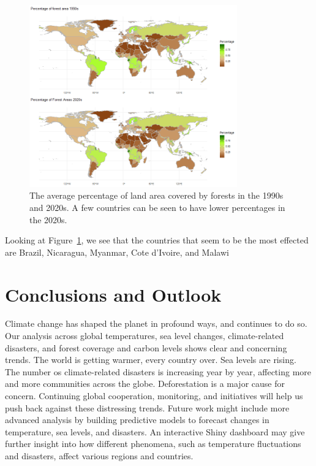 \documentclass[10pt]{article}
\begin{document}
\begin{figure}[H]
    \centering
    \includegraphics[width=0.8\textwidth]{forest_pct.png}
    \caption{The average percentage of land area covered by forests in the 1990s and 2020s. A few countries can be seen to have lower percentages in the 2020s.}
    \label{fig:forest_pct}
\end{figure}

Looking at Figure~\ref{fig:forest_pct}, we see that the countries that seem to be the most effected are Brazil, Nicaragua, Myanmar, Cote d'Ivoire, and Malawi


\section{Conclusions and Outlook}  
\label{Outlook}
Climate change has shaped the planet in profound ways, and continues to do so. Our analysis across global temperatures, sea level changes, climate-related disasters, and forest coverage and carbon levels shows clear and concerning trends. The world is getting warmer, every country over. Sea levels are rising. The number os climate-related disasters is increasing year by year, affecting more and more communities across the globe. Deforestation is a major cause for concern. Continuing global cooperation, monitoring, and initiatives will help us push back against these distressing trends. Future work might include more advanced analysis by building predictive models to forecast changes in temperature, sea levels, and disasters. An interactive Shiny dashboard may give further insight into how different phenomena, such as temperature fluctuations and disasters, affect various regions and countries. 
\end{document}
